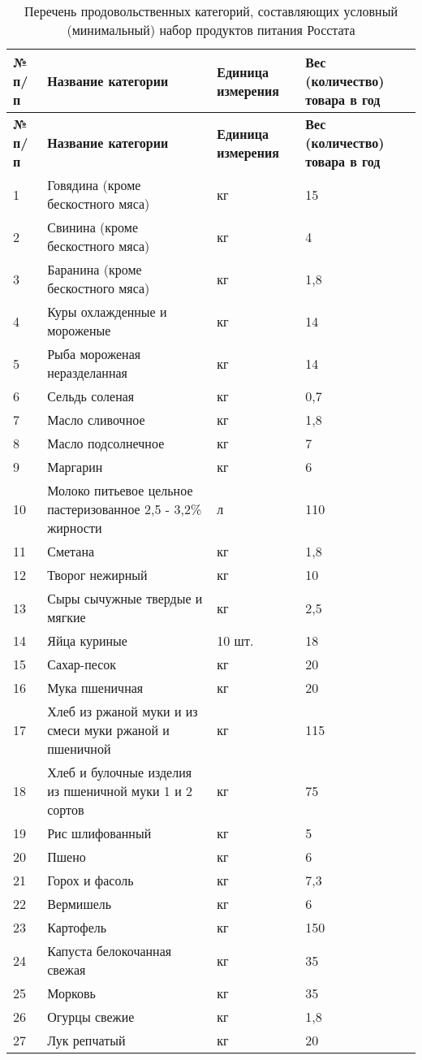 \begin{longtable}{p{0.5cm} p{3.5cm} p{3.5cm} p{3cm}} %
	\caption{Перечень продовольственных категорий, составляющих условный (минимальный) набор продуктов питания Росстата} \label{tab:food_categories} \\
	\toprule
	\textbf{№ п/п} & \textbf{Название категории} & \textbf{Единица измерения} & \textbf{Вес (количество) товара в год} \\
	\midrule
	\endfirsthead
	
	\toprule
	\textbf{№ п/п} & \textbf{Название категории} & \textbf{Единица измерения} & \textbf{Вес (количество) товара в год} \\
	\midrule
	\endhead
	
	\endfoot
	
	\endlastfoot
	
	\footnotesize %
	1   & Говядина (кроме бескостного мяса) & кг & 15 \\
	2   & Свинина (кроме бескостного мяса) & кг & 4 \\
	3   & Баранина (кроме бескостного мяса) & кг & 1,8 \\
	4   & Куры охлажденные и мороженые & кг & 14 \\
	5   & Рыба мороженая неразделанная & кг & 14 \\
	6   & Сельдь соленая & кг & 0,7 \\
	7   & Масло сливочное & кг & 1,8 \\
	8   & Масло подсолнечное & кг & 7 \\
	9   & Маргарин & кг & 6 \\
	10  & Молоко питьевое цельное пастеризованное 2,5 - 3,2\% жирности & л & 110 \\
	11  & Сметана & кг & 1,8 \\
	12  & Творог нежирный & кг & 10 \\
	13  & Сыры сычужные твердые и мягкие & кг & 2,5 \\
	14  & Яйца куриные & 10 шт. & 18 \\
	15  & Сахар-песок & кг & 20 \\
	16  & Мука пшеничная & кг & 20 \\
	17  & Хлеб из ржаной муки и из смеси муки ржаной и пшеничной & кг & 115 \\
	18  & Хлеб и булочные изделия из пшеничной муки 1 и 2 сортов & кг & 75 \\
	19  & Рис шлифованный & кг & 5 \\
	20  & Пшено & кг & 6 \\
	21  & Горох и фасоль & кг & 7,3 \\
	22  & Вермишель & кг & 6 \\
	23  & Картофель & кг & 150 \\
	24  & Капуста белокочанная свежая & кг & 35 \\
	25  & Морковь & кг & 35 \\
	26  & Огурцы свежие & кг & 1,8 \\
	27  & Лук репчатый & кг & 20 \\
	
\end{longtable}

